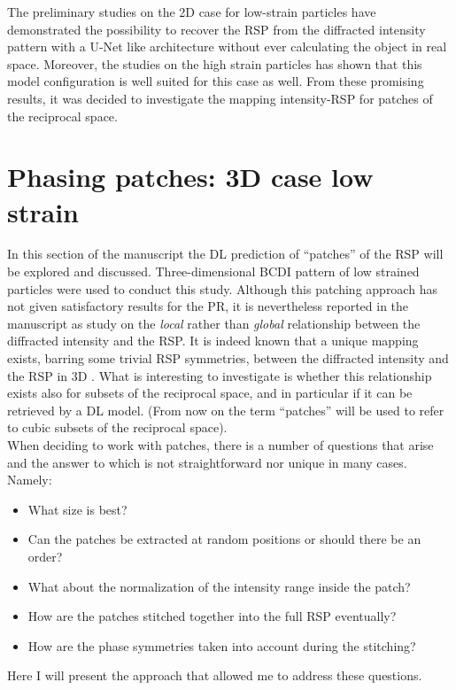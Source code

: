 The preliminary studies on the 2D case for low-strain particles have demonstrated the possibility to recover the RSP from 
the diffracted intensity pattern with a U-Net like architecture without ever calculating the object in real space. Moreover, 
the studies on the high strain particles has shown that this model configuration is well suited for this case as well.
From these promising results, it was decided to investigate the mapping intensity-RSP for patches of the reciprocal space. 


\section{Phasing patches: 3D case low strain}\label{chp:patches_nostrain}
In this section of the manuscript the DL prediction of ``patches'' of the RSP will be explored and discussed. 
Three-dimensional BCDI pattern of low strained particles were used to conduct this study. 
Although this patching approach has not given satisfactory results for the PR, it is nevertheless reported in the manuscript as 
study on the \textit{local} rather than \textit{global} relationship between the diffracted intensity and the RSP. It is 
indeed known that a unique mapping exists, barring some trivial RSP symmetries, between the diffracted intensity 
and the RSP in 3D \cite{Miao:98}. What is interesting to investigate is whether this relationship exists also for subsets 
of the reciprocal space, and in particular if it can be retrieved by a DL model. (From now on the term ``patches'' 
will be used to refer to cubic subsets of the reciprocal space). \\

When deciding to work with patches, there is a number of questions that arise and the answer to which is not 
straightforward nor unique in many cases. Namely: 
\begin{itemize}
    \item What size is best? 
    \item Can the patches be extracted at random positions or should there be an order? 
    \item What about the normalization of the intensity range inside the patch? 
    \item How are the patches stitched together into the full RSP eventually? 
    \item How are the phase symmetries taken into account during the stitching? 
\end{itemize}
Here I will present the approach that allowed me to address these questions. 

